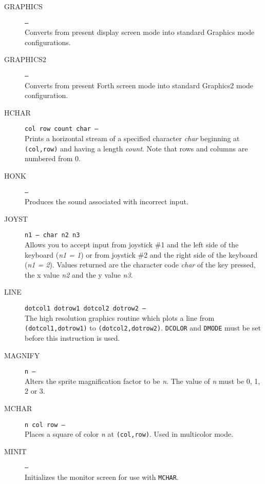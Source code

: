 \documentclass{article}
\begin{document}
\begin{multicols}{2}[]
\begin{description}
			\item[GRAPHICS]\texttt{--- }\\
				Converts from present display screen mode into standard Graphics mode
				configurations.

			\item[GRAPHICS2]\texttt{--- }\\
				Converts from present Forth screen mode into standard Graphics2 mode
				configuration.

			\item[HCHAR]\texttt{col row count char --- }\\
				Prints a horizontal stream of a specified character \textit{char}
				beginning at \verb|(col,row)| and having a length \textit{count}.
				Note that rows and columns are numbered from 0.

			\item[HONK]\texttt{--- }\\
				Produces the sound associated with incorrect input.

			\item[JOYST]\texttt{n1 --- char n2 n3 }\\
				Allows you to accept input from joystick \#1 and the left side of
				the keyboard (\textit{n1 = 1}) or from joystick \#2 and the right
				side of the keyboard (\textit{n1 = 2}). Values returned are
				the character code \textit{char} of the key pressed, the x value
				\textit{n2} and the y value \textit{n3}.

			\item[LINE]\texttt{dotcol1 dotrow1 dotcol2 dotrow2 --- }\\
				The high resolution graphics routine which plots a line from
				\verb|(dotcol1,dotrow1)| to \verb|(dotcol2,dotrow2)|. \verb|DCOLOR|
				and \verb|DMODE| must be set before this instruction is used.

			\item[MAGNIFY]\texttt{n --- }\\
				Alters the sprite magnification factor to be \textit{n}. The value
				of \textit{n} must be 0, 1, 2 or 3.

			\item[MCHAR]\texttt{n col row --- }\\
				Places a square of color \textit{n} at \verb|(col,row)|. Used in
				multicolor mode.

			\item[MINIT]\texttt{--- }\\
				Initializes the monitor screen for use with \verb|MCHAR|.


\end{description}
\end{multicols}
\end{document}
